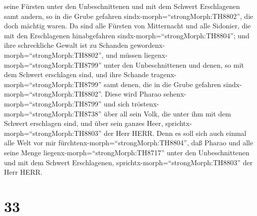 seine Fürsten unter den Unbeschnittenen und mit dem Schwert Erschlagenen
samt andern, so in die Grube gefahren
sindx-morph=``strongMorph:TH8802'', die doch mächtig waren.
 Da sind alle Fürsten von Mitternacht und alle Sidonier,
die mit den Erschlagenen hinabgefahren
sindx-morph=``strongMorph:TH8804''; und ihre schreckliche Gewalt ist zu
Schanden gewordenx-morph=``strongMorph:TH8802'', und müssen
liegenx-morph=``strongMorph:TH8799'' unter den Unbeschnittenen und
denen, so mit dem Schwert erschlagen sind, und ihre Schande
tragenx-morph=``strongMorph:TH8799'' samt denen, die in die Grube
gefahren sindx-morph=``strongMorph:TH8802''.  Diese wird
Pharao sehenx-morph=``strongMorph:TH8799'' und sich
tröstenx-morph=``strongMorph:TH8738'' über all sein Volk, die unter ihm
mit dem Schwert erschlagen sind, und über sein ganzes Heer,
sprichtx-morph=``strongMorph:TH8803'' der Herr HERR.  Denn
es soll sich auch einmal alle Welt vor mir
fürchtenx-morph=``strongMorph:TH8804'', daß Pharao und alle seine Menge
liegenx-morph=``strongMorph:TH8717'' unter den Unbeschnittenen und mit
dem Schwert Erschlagenen, sprichtx-morph=``strongMorph:TH8803'' der Herr
HERR.

\hypertarget{section-32}{%
\section{33}\label{section-32}}

